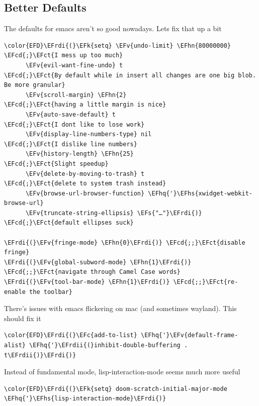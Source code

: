 \documentclass{scrartcl}
\newcommand{\EFk}[1]{\textcolor{EFk}{#1}} %
\newcommand{\EFs}[1]{\textcolor{EFs}{#1}} %
\newcommand{\EFct}[1]{\textcolor{EFct}{#1}} %
\newcommand{\EFc}[1]{\textcolor{EFc}{#1}} %
\newcommand{\EFv}[1]{\textcolor{EFv}{#1}} %
\newcommand{\EFcd}[1]{\textcolor{EFcd}{#1}} %
\newcommand{\EFhn}[1]{#1} %
\newcommand{\EFhq}[1]{#1} %
\newcommand{\EFhs}[1]{#1} %
\newcommand{\EFrdi}[1]{#1} %
\newcommand{\EFrdii}[1]{#1} %
\begin{document}
\subsection{Better Defaults}
\label{sec:org6b78402}
The defaults for emacs aren't so good nowadays. Lets fix that up a bit
\begin{Code}
\begin{Verbatim}[]
\color{EFD}\EFrdi{(}\EFk{setq} \EFv{undo-limit} \EFhn{80000000}                          \EFcd{;}\EFct{I mess up too much}
      \EFv{evil-want-fine-undo} t                        \EFcd{;}\EFct{By default while in insert all changes are one big blob. Be more granular}
      \EFv{scroll-margin} \EFhn{2}                              \EFcd{;}\EFct{having a little margin is nice}
      \EFv{auto-save-default} t                          \EFcd{;}\EFct{I dont like to lose work}
      \EFv{display-line-numbers-type} nil                \EFcd{;}\EFct{I dislike line numbers}
      \EFv{history-length} \EFhn{25}                            \EFcd{;}\EFct{Slight speedup}
      \EFv{delete-by-moving-to-trash} t                  \EFcd{;}\EFct{delete to system trash instead}
      \EFv{browse-url-browser-function} \EFhq{'}\EFhs{xwidget-webkit-browse-url}
      \EFv{truncate-string-ellipsis} \EFs{"…"}\EFrdi{)}                \EFcd{;}\EFct{default ellipses suck}

\EFrdi{(}\EFv{fringe-mode} \EFhn{0}\EFrdi{)} \EFcd{;;}\EFct{disable fringe}
\EFrdi{(}\EFv{global-subword-mode} \EFhn{1}\EFrdi{)} \EFcd{;;}\EFct{navigate through Camel Case words}
\EFrdi{(}\EFv{tool-bar-mode} \EFhn{1}\EFrdi{)} \EFcd{;;}\EFct{re-enable the toolbar}
\end{Verbatim}
\end{Code}

There's issues with emacs flickering on mac (and sometimes wayland). This should
fix it
\begin{Code}
\begin{Verbatim}[]
\color{EFD}\EFrdi{(}\EFc{add-to-list} \EFhq{'}\EFv{default-frame-alist} \EFhq{'}\EFrdii{(}inhibit-double-buffering . t\EFrdii{)}\EFrdi{)}
\end{Verbatim}
\end{Code}

Instead of fundamental mode, lisp-interaction-mode seems much more useful
\begin{Code}
\begin{Verbatim}[]
\color{EFD}\EFrdi{(}\EFk{setq} doom-scratch-initial-major-mode \EFhq{'}\EFhs{lisp-interaction-mode}\EFrdi{)}
\end{Verbatim}
\end{Code}
\end{document}
